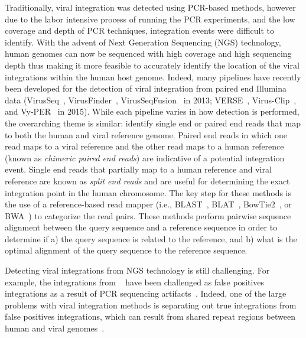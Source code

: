 \documentclass[12pt]{article}
\begin{document}
Traditionally, viral integration was detected using PCR-based methods, however due to the labor intensive process of running the PCR experiments, and the low coverage and depth of PCR techniques, integration events were difficult to identify.  With the advent of Next Generation Sequencing (NGS) technology, human genomes can now be sequenced with high coverage and high sequencing depth thus making it more feasible to accurately identify the location of the viral integrations within the human host genome.  Indeed, many pipelines have recently been developed for the detection of viral integration from paired end Illumina data (VirusSeq~\cite{Chen2013}, VirusFinder~\cite{Wang2013}, VirusSeqFusion~\cite{Li2013} in 2013; VERSE~\cite{Wang2015}, Virus-Clip~\cite{Ho2015}, and Vy-PER~\cite{Forster2015} in 2015).  While each pipeline varies in how detection is performed, the overarching theme is similar: identify single end or paired end reads that map to both the human and viral reference genome.  Paired end reads in which one read maps to a viral reference and the other read maps to a human reference (known as \emph{chimeric paired end reads}) are indicative of a potential integration event.  Single end reads that partially map to a human reference and viral reference are known as \emph{split end reads} and are useful for determining the exact integration point in the human chromosome.  The key step for these methods is the use of a reference-based read mapper (i.e., BLAST~\cite{Altschul1990}, BLAT~\cite{Kent2002}, BowTie2~\cite{Langmead2012}, or BWA~\cite{Li2009}) to categorize the read pairs.  These methods perform pairwise sequence alignment between the query sequence and a reference sequence in order to determine if a) the query sequence is related to the reference, and b) what is the optimal alignment of the query sequence to the reference sequence.

Detecting viral integrations from NGS technology is still challenging.  For example, the integrations from ~\cite{Hu2015} have been challenged as false positives integrations as a result of PCR sequencing artifacts~\cite{Dyer2015}.  Indeed, one of the large problems with viral integration methods is separating out true integrations from false positives integrations, which can result from shared repeat regions between human and viral genomes~\cite{Forster2015}.  
\end{document}
